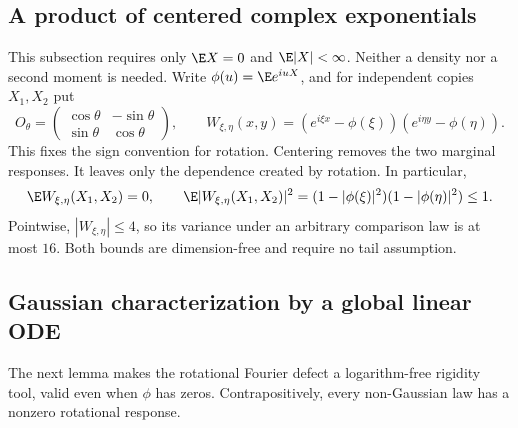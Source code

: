 \subsection{A product of centered complex exponentials}
\label{sec:product-of-centered-exponentials}

This subsection requires only $\E X=0$ and $\E|X|<\infty$.
Neither a density nor a second moment is needed.
Write
$\phi(u)=\E e^{iuX}$, and for independent copies $X_1,X_2$ put
\[
 O_\theta=\begin{pmatrix}\cos\theta&-\sin\theta\\
                         \sin\theta&\cos\theta\end{pmatrix},
 \qquad
 W_{\xi,\eta}(x,y)
   =(e^{i\xi x}-\phi(\xi))(e^{i\eta y}-\phi(\eta)).
\]
This fixes the sign convention for rotation.
Centering removes the two marginal responses.
It leaves only the dependence created by rotation.
In particular,
\begin{equation}
 \E W_{\xi,\eta}(X_1,X_2)=0,
 \qquad
 \E|W_{\xi,\eta}(X_1,X_2)|^2
 =(1-|\phi(\xi)|^2)(1-|\phi(\eta)|^2)\le1.
 \label{eq:centered-exponential-product-variance}
\end{equation}
Pointwise, $|W_{\xi,\eta}|\le4$, so its variance under an arbitrary
comparison law is at most $16$.  Both bounds are dimension-free and require
no tail assumption.

\subsection{Gaussian characterization by a global linear ODE}
\label{sec:fourier-ode}

The next lemma makes the rotational Fourier defect a logarithm-free rigidity
tool, valid even when \(\phi\) has zeros.  Contrapositively, every
non-Gaussian law has a nonzero rotational response.

